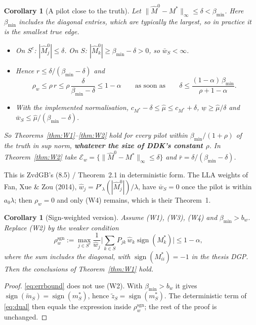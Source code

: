 \documentclass[11pt,a4paper]{article}
\numberwithin{equation}{section}
\theoremstyle{plain}
\newtheorem{corollary}[theorem]{Corollary}
\theoremstyle{remark}
\DeclareMathOperator{\sign}{sign}
\begin{document}
\begin{corollary}[A pilot close to the truth]\label{cor:W3}
Let $\|\hat M^0-M^*\|_\infty\le\delta<\beta_{\min}$. Here $\beta_{\min}$ includes the diagonal entries, which are typically the largest, so in practice it is the smallest true edge.
\begin{itemize}
  \item On $S^c$: $|\hat M^0_j|\le\delta$. On $S$: $|\hat M^0_k|\ge\beta_{\min}-\delta>0$, so $\bar w_S<\infty$.
  \item Hence $r\le\delta/(\beta_{\min}-\delta)$ and
  \[
  \rho_w\le\rho\,r\le\rho\,\frac{\delta}{\beta_{\min}-\delta}\le1-\alpha\qquad\text{as soon as}\qquad \delta\le\frac{(1-\alpha)\,\beta_{\min}}{\rho+1-\alpha}.
  \]
  \item With the implemented normalisation, $c_{M^*}-\delta\le\hat\mu\le c_{M^*}+\delta$, $\underline w\ge\hat\mu/\delta$ and $\bar w_S\le\hat\mu/(\beta_{\min}-\delta)$.
\end{itemize}
So Theorems~\ref{thm:W1}--\ref{thm:W2} hold for every pilot within $\beta_{\min}/(1+\rho)$ of the truth in sup norm, \textbf{whatever the size of DDK's constant $\rho$}. In Theorem~\ref{thm:W2} take $\mathcal E_w=\{\|\hat M^0-M^*\|_\infty\le\delta\}$ and $\bar r=\delta/(\beta_{\min}-\delta)$.
\end{corollary}

This is ZvdGB's (8.5) / Theorem~2.1 in deterministic form. The LLA weights of Fan, Xue \& Zou (2014), $\hat w_j=P'_\lambda(|\hat M^0_j|)/\lambda$, have $\bar w_S=0$ once the pilot is within $a_0\lambda$; then $\rho_w=0$ and only (W4) remains, which is their Theorem~1.

\begin{corollary}[Sign-weighted version]\label{cor:W4}
Assume (W1), (W3), (W4) and $\beta_{\min}>b_w$. Replace (W2) by the weaker condition
\[
\rho_w^{\mathrm{sgn}}:=\max_{j\in S^c}\frac{1}{\hat w_j}\Big|\sum_{k\in S}P_{jk}\,\hat w_k\sign(M^*_k)\Big|\le1-\alpha ,
\]
where the sum includes the diagonal, with $\sign(M^*_{ii})=-1$ in the thesis DGP. Then the conclusions of Theorem~\ref{thm:W1} hold.
\end{corollary}

\begin{proof}
\eqref{eq:errbound} does not use (W2). With $\beta_{\min}>b_w$ it gives $\sign(\tilde m_S)=\sign(m^*_S)$, hence $\tilde z_S=\sign(m^*_S)$. The deterministic term of \eqref{eq:dual} then equals the expression inside $\rho_w^{\mathrm{sgn}}$; the rest of the proof is unchanged.
\end{proof}
\end{document}
